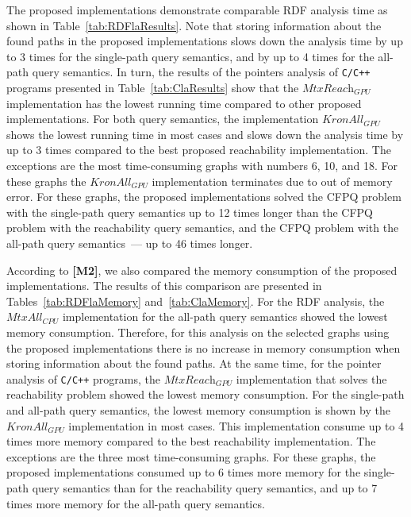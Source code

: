 The proposed implementations demonstrate comparable RDF analysis time as shown in Table~\ref{tab:RDFlaResults}. Note that storing information about the found paths in the proposed implementations slows down the analysis time by up to 3 times for the single-path query semantics, and by up to 4 times for the all-path query semantics. In turn, the results of the pointers analysis of \texttt{C/C++} programs presented in Table~\ref{tab:ClaResults} show that the $\textit{MtxReach}_{\textit{GPU}}$ implementation has the lowest running time compared to other proposed implementations. For both query semantics, the implementation $\textit{KronAll}_{\textit{GPU}}$ shows the lowest running time in most cases and slows down the analysis time by up to 3 times compared to the best proposed reachability implementation. The exceptions are the most time-consuming graphs with numbers 6, 10, and 18. For these graphs the $\textit{KronAll}_{\textit{GPU}}$ implementation terminates due to out of memory error. For these graphs, the proposed implementations solved the CFPQ problem with the single-path query semantics up to 12 times longer than the CFPQ problem with the reachability query semantics, and the CFPQ problem with the all-path query semantics~--- up to 46 times longer.

According to \textbf{[M2]}, we also compared the memory consumption of the proposed implementations. The results of this comparison are presented in Tables~\ref{tab:RDFlaMemory} and~\ref{tab:ClaMemory}. For the RDF analysis, the $\textit{MtxAll}_{\textit{CPU}}$ implementation for the all-path query semantics showed the lowest memory consumption. Therefore, for this analysis on the selected graphs using the proposed implementations there is no increase in memory consumption when storing information about the found paths. At the same time, for the pointer analysis of \texttt{C/C++} programs, the $\textit{MtxReach}_{\textit{GPU}}$ implementation that solves the reachability problem showed the lowest memory consumption. For the single-path and all-path query semantics, the lowest memory consumption is shown by the $\textit{KronAll}_{\textit{GPU}}$ implementation in most cases. This implementation consume up to 4 times more memory compared to the best reachability implementation. The exceptions are the three most time-consuming graphs. For these graphs, the proposed implementations consumed up to 6 times more memory for the single-path query semantics than for the reachability query semantics, and up to 7 times more memory for the all-path query semantics.

